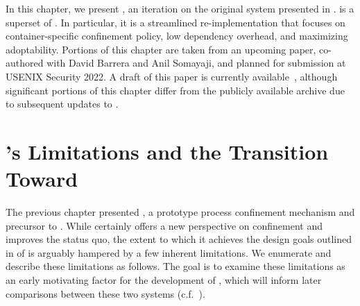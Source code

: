 In this chapter, we present \bpfcontain{}, an iteration on the original \bpfbox{} system
presented in . \bpfcontain{} is a superset of \bpfbox. In particular, it is
a streamlined re-implementation that focuses on container-specific confinement policy, low
dependency overhead, and maximizing adoptability. Portions of this chapter are taken from
an upcoming paper, co-authored with David Barrera and Anil Somayaji, and planned for
submission at USENIX Security 2022. A draft of this paper is currently
available~\cite{findlay2021_bpfcontain}, although significant portions of this chapter
differ from the publicly available archive due to subsequent updates to \bpfcontain{}.



\section{\bpfbox{}'s Limitations and the Transition Toward \bpfcontain{}}%
\label{s:bpfcontain-bpfbox-limitations}

The previous chapter presented \bpfbox{}, a prototype process confinement mechanism and
precursor to \bpfcontain{}. While \bpfbox{} certainly offers a new perspective on
confinement and improves the status quo, the extent to which it achieves the design goals
outlined in  of  is arguably hampered by
a few inherent limitations. We enumerate and describe these limitations as follows.  The
goal is to examine these limitations as an early motivating factor for the development of
\bpfcontain{}, which will inform later comparisons between these two systems
(c.f.\ ).


